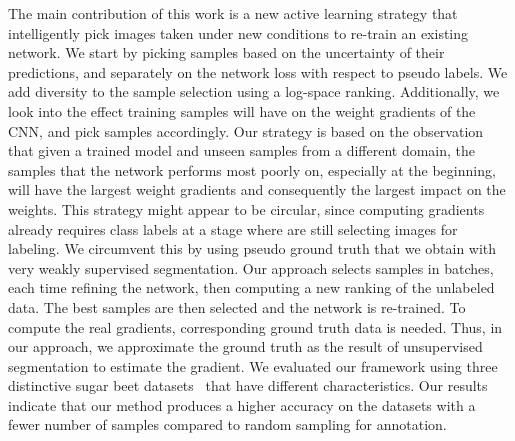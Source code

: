 \documentclass[letterpaper, 10 pt, conference]{ieeeconf}  %
\begin{document}
The main contribution of this work is a new active learning strategy that
intelligently pick images taken under new conditions to re-train an existing network.
We start by picking samples based 
on the uncertainty of their predictions, and separately on the network loss with respect 
to pseudo labels. We add diversity to the sample selection using a log-space ranking.
Additionally, we look into the effect training samples will have on the weight gradients of the CNN,
and pick samples accordingly.
Our strategy is based  on the observation that given a trained model and unseen
samples from  a different domain, the samples that the network performs most
poorly on, especially at the  beginning, will have the largest weight
gradients and consequently the largest impact on the  weights. This strategy might appear to be circular, since computing gradients already requires class labels at a stage where are still selecting images for labeling.  We circumvent this by using pseudo ground truth that we obtain with very weakly supervised segmentation. Our approach
selects samples in batches, each time refining the network, then computing a
new  ranking of the unlabeled data. The best samples are then selected and the
network is re-trained. To compute the real gradients, corresponding ground
truth data is needed. Thus, in our approach, we approximate the ground truth as the result of unsupervised segmentation to estimate the gradient.  We
evaluated our framework using three distinctive sugar beet datasets~\cite{chebrolu2017agricultural} that have different characteristics.  Our results indicate that our method produces a
higher accuracy on the datasets with a fewer  number of samples compared to
random sampling for annotation.


 
   


   

\end{document}
